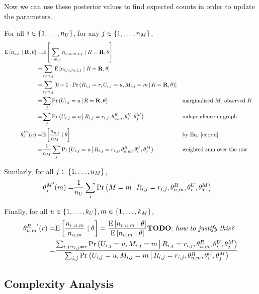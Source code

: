 \documentclass{article}
\begin{document}
Now we can use these posterior values to find expected counts in order
to update the parameters.

For all $i \in {\left\{ 1, \dots, n_U \right\}}$, for any $j \in {\left\{ 1, \dots, n_M \right\}}$,
\begin{align}
  {\textrm{E} \left[ n_{u,i} \mid {\bf R}, \theta \right]}
  =& {\textrm{E} \left[  \sum_{r,m,j} n_{r,u,m,i,j}  \mid R = {\bf R}, \theta \right]} \\
  =& \sum_{r,m,j} {\textrm{E} \left[  n_{r,u,m,i,j}  \mid R = {\bf R}, \theta \right]} \\
  =& \sum_{r,m,j} \left[
    0 + 1 \cdot {{\Pr \left(   R_{i,j} = r, U_{i,j} = u, M_{i,j} = m  \,\middle|\, R = {\bf R}, \theta  \right)}}
  \right] \\
  =& \sum_j {{\Pr \left(  U_{i,j} = u \,\middle|\, R = {\bf R}, \theta  \right)}}
  && \text{marginalized $M$, observed $R$} \\
  =& \sum_j {{\Pr \left(  U_{i,j} = u \,\middle|\, R_{i,j} = r_{i,j}, \theta^R_{u,m},
    \theta^U_i, \theta^M_j  \right)}}
  && \text{independence in graph} \\
  {\theta^U_i}'(u)
  =& {\textrm{E} \left[  \frac{ n_{u,i}}{ n_M }  \mid \theta \right]} && \text{by Eq. \ref{eq:pui}} \\
  =& \frac{1}{n_M} \sum_j {{\Pr \left(  U_{i,j} = u \,\middle|\,  R_{i,j} = r_{i,j}, \theta^R_{u,m},
    \theta^U_i, \theta^M_j   \right)}}
  && \text{weighted sum over the row}
\end{align}

Similarly, for all $j \in {\left\{ 1, \dots, n_M \right\}}$,
\begin{align}
  {\theta^M_j}'(m) =&
  \frac{1}{n_U} \sum_i {{\Pr \left(  M = m \,\middle|\, 
    R_{i,j} = r_{i,j}, \theta^R_{u,m}, \theta^U_i, \theta^M_j  \right)}}
\end{align}

Finally, for all $u \in {\left\{ 1, \dots, k_U \right\}}, m \in {\left\{ 1, \dots, k_M \right\}}$,
\begin{align}
  {\theta^R_{u,m}}'(r)
  =& {\textrm{E} \left[  \frac{n_{r,u,m}}{n_{u,m}}  \mid \theta \right]}
  = \frac{ {\textrm{E} \left[ n_{r,u,m}  \mid \theta \right]} }{ {\textrm{E} \left[ n_{u,m} \mid \theta \right]} }
   \text{{\textbf{TODO}: \textit{how to justify this?}}} \\
  =& \frac{\sum_{i,j: r_{i,j} = r} {{\Pr \left(  U_{i,j} = u, M_{i,j} = m \,\middle|\, 
      R_{i,j} = r_{i,j}, \theta^R_{u,m}, \theta^U_i, \theta^M_j  \right)}}
  }{ \sum_{i,j} {{\Pr \left(  U_{i,j} = u, M_{i,j} = m \,\middle|\, 
      R_{i,j} = r_{i,j}, \theta^R_{u,m}, \theta^U_i, \theta^M_j  \right)}} } \\
\end{align}

\subsection{Complexity Analysis}
\end{document}
